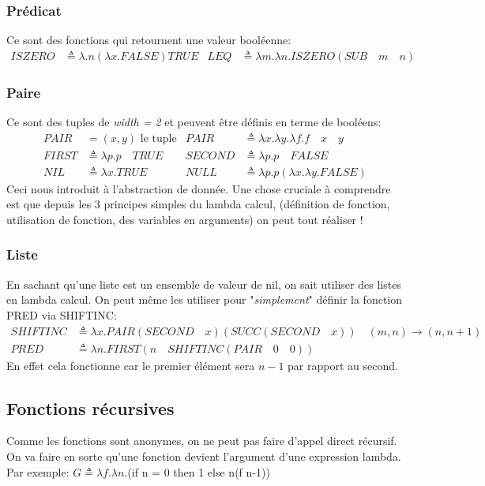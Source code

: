 \documentclass{report}
\begin{document}
\subsubsection{Prédicat}
Ce sont des fonctions qui retournent une valeur booléenne:
\begin{align*}
ISZERO &\triangleq \lambda .n (\lambda x.FALSE) TRUE & LEQ &\triangleq \lambda m.\lambda n.ISZERO (SUB \quad m \quad n)
\end{align*}

\subsubsection{Paire}
Ce sont des tuples de \textit{width = 2} et peuvent être définis en terme de booléens:
\begin{align*}
PAIR &= (x,y) \text{ le tuple} & PAIR &\triangleq \lambda x.\lambda y.\lambda f.f \quad x \quad y\\
FIRST &\triangleq \lambda p.p \quad TRUE & SECOND &\triangleq \lambda p.p \quad FALSE\\ 
NIL &\triangleq \lambda x.TRUE & NULL &\triangleq \lambda p.p (\lambda x.\lambda y.FALSE)
\end{align*}
Ceci nous introduit à l'abstraction de donnée. Une chose cruciale à comprendre est que depuis les 3 principes simples du lambda calcul, (définition de fonction, utilisation de fonction, des variables en arguments) on peut tout réaliser !

\subsubsection{Liste}
En sachant qu'une liste est un ensemble de valeur de nil, on sait utiliser des listes en lambda calcul. On peut même les utiliser pour "\textit{simplement}" définir la fonction PRED via SHIFTINC:
\begin{align*}
SHIFTINC &\triangleq \lambda x.PAIR (SECOND \quad x) (SUCC (SECOND \quad x)) \quad (m,n) \rightarrow (n,n+1)\\
PRED &\triangleq \lambda n.FIRST (n \quad SHIFTINC (PAIR \quad 0 \quad 0))
\end{align*}
En effet cela fonctionne car le premier élément sera $n-1$ par rapport au second.

\subsection{Fonctions récursives}
Comme les fonctions sont anonymes, on ne peut pas faire d'appel direct récursif. On va faire en sorte qu'une fonction devient l'argument d'une expression lambda. Par exemple:
$G \triangleq \lambda f.\lambda n.$(if n = 0 then 1 else n(f n-1))
\end{document}
